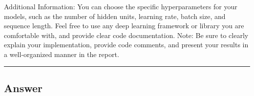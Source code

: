\documentclass[
  letterpaper,
  DIV=11,
  numbers=noendperiod]{scrartcl}
\begin{document}
Additional Information: You can choose the specific hyperparameters for
your models, such as the number of hidden units, learning rate, batch
size, and sequence length. Feel free to use any deep learning framework
or library you are comfortable with, and provide clear code
documentation. Note: Be sure to clearly explain your implementation,
provide code comments, and present your results in a well-organized
manner in the report.

\begin{center}\rule{0.5\linewidth}{0.5pt}\end{center}

\subsection{Answer}\label{answer-1}
\end{document}
